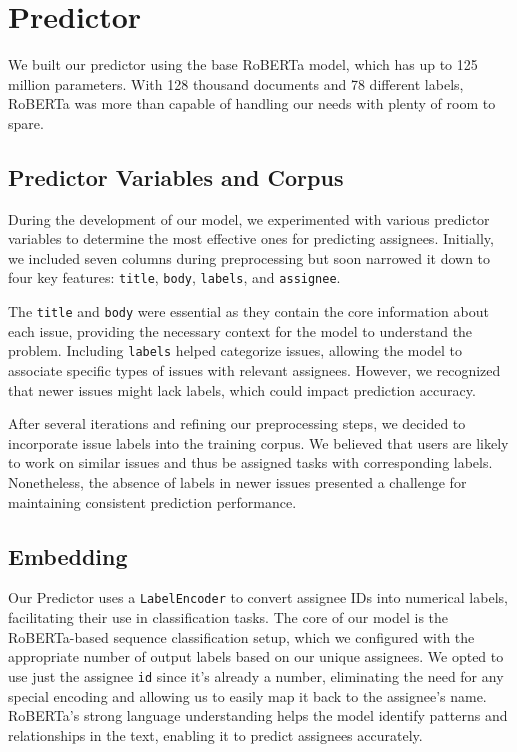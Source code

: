 \documentclass[tikz,10pt,fleqn]{article}
\begin{document}
\section*{Predictor} We built our predictor using the base RoBERTa model, which has up to 125 million parameters. With 128 thousand documents and 78 different labels, RoBERTa was more than capable of handling our needs with plenty of room to spare.

\subsection{Predictor Variables and Corpus} During the development of our model, we experimented with various predictor variables to determine the most effective ones for predicting assignees. Initially, we included seven columns during preprocessing but soon narrowed it down to four key features: \texttt{title}, \texttt{body}, \texttt{labels}, and \texttt{assignee}.

The \texttt{title} and \texttt{body} were essential as they contain the core information about each issue, providing the necessary context for the model to understand the problem. Including \texttt{labels} helped categorize issues, allowing the model to associate specific types of issues with relevant assignees. However, we recognized that newer issues might lack labels, which could impact prediction accuracy.

After several iterations and refining our preprocessing steps, we decided to incorporate issue labels into the training corpus. We believed that users are likely to work on similar issues and thus be assigned tasks with corresponding labels. Nonetheless, the absence of labels in newer issues presented a challenge for maintaining consistent prediction performance.

\subsection{Embedding} Our Predictor uses a \texttt{LabelEncoder} to convert assignee IDs into numerical labels, facilitating their use in classification tasks. The core of our model is the RoBERTa-based sequence classification setup, which we configured with the appropriate number of output labels based on our unique assignees. We opted to use just the assignee \texttt{id} since it's already a number, eliminating the need for any special encoding and allowing us to easily map it back to the assignee's name. RoBERTa's strong language understanding helps the model identify patterns and relationships in the text, enabling it to predict assignees accurately.
\end{document}
